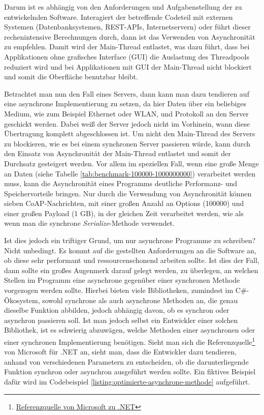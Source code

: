 Darum ist es abhängig von den Anforderungen und Aufgabenstellung der zu entwickelnden Software. Interagiert der betreffende Codeteil mit externen Systemen (Datenbanksystemen, REST-APIs, Internetservern) oder führt dieser rechenintensive Berechnungen durch, dann ist das Verwenden von Asynchronität zu empfehlen. Damit wird der Main-Thread entlastet, was dazu führt, dass bei Applikationen ohne grafisches Interface (GUI) die Auslastung des Threadpools reduziert wird und bei Applikationen mit GUI der Main-Thread nicht blockiert und somit die Oberfläche benutzbar bleibt.

Betrachtet man nun den Fall eines Servers, dann kann man dazu tendieren auf eine asynchrone Implementierung zu setzen, da hier Daten über ein beliebiges Medium, wie zum Beispiel Ethernet oder WLAN, und Protokoll an den Server geschickt werden. Dabei weiß der Server jedoch nicht im Vorhinein, wann diese Übertragung komplett abgeschlossen ist. Um nicht den Main-Thread des Servers zu blockieren, wie es bei einem synchronen Server passieren würde, kann durch den Einsatz von Asynchronität der Main-Thread entlastet und somit der Durchsatz gesteigert werden. Vor allem im speziellen Fall, wenn eine große Menge an Daten (siehe Tabelle \ref{tab:benchmark-100000-1000000000}) verarbeitet werden muss, kann die Asynchronität eines Programms deutliche Performanz- und Speichervorteile bringen. Nur durch die Verwendung von Asynchronität können sieben CoAP-Nachrichten, mit einer großen Anzahl an Options (100000) und einer großen Payload (1 GB), in der gleichen Zeit verarbeitet werden, wie als wenn man die synchrone \textit{Serialize}-Methode verwendet.

Ist dies jedoch ein triftiger Grund, um nur asynchrone Programme zu schreiben? Nicht unbedingt. Es kommt auf die gestellten Anforderungen an die Software an, ob diese sehr performant und ressourcenschonend arbeiten sollte. Ist dies der Fall, dann sollte ein großes Augenmerk darauf gelegt werden, zu überlegen, an welchen Stellen im Programm eine asynchrone gegenüber einer synchronen Methode vorgezogen werden sollte. Hierbei bieten viele Bibliotheken, zumindest im C\#-Ökosystem, sowohl synchrone als auch asynchrone Methoden an, die genau dieselbe Funktion abbilden, jedoch abhängig davon, ob es synchron oder asynchron passieren soll. Ist man jedoch selbst ein Entwickler einer solchen Bibliothek, ist es schwierig abzuwägen, welche Methoden einer asynchronen oder einer synchronen Implementierung benötigen. Sieht man sich die Referenzquelle\footnote{\href{https://github.com/microsoft/referencesource}{Referenzquelle von Microsoft zu .NET}} von Microsoft für .NET an, sieht man, dass die Entwickler dazu tendieren, anhand von verschiedenen Parametern zu entscheiden, ob die darunterliegende Funktion synchron oder asynchron ausgeführt werden sollte. Ein fiktives Beispiel dafür wird im Codebeispiel \ref{listing:optimierte-asynchrone-methode} aufgeführt.

